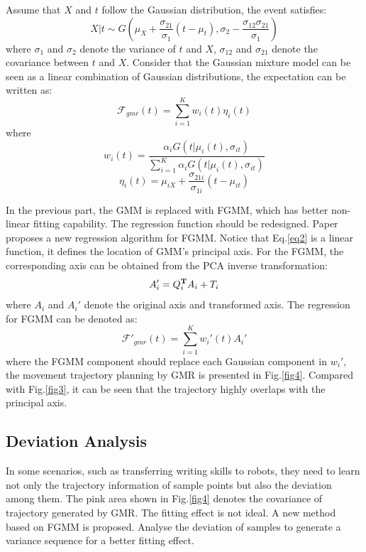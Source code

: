 \documentclass[journal]{IEEEtran}
\begin{document}
Assume that $X$ and $t$ follow the Gaussian distribution, the event satisfies:
\begin{equation}
    X|t \sim G(\mu_X+\frac{\sigma_{21}}{\sigma_{1}}(t-\mu_t),\sigma_{2}-\frac{\sigma_{12}\sigma_{21}}{\sigma_{1}})
\end{equation}
where $\sigma_{1}$ and $\sigma_{2}$ denote the variance of $t$ and $X$, $\sigma_{12}$ and $\sigma_{21}$ denote the covariance between $t$ and $X$. Consider that the Gaussian mixture model can be seen as a linear combination of Gaussian distributions, the expectation can be written as:
\begin{equation}
    \mathcal{F} _{gmr}(t)=\sum\limits_{i=1}^{K}w_i(t)\eta_i(t)
\end{equation}
where
\begin{equation}
    w_i(t)=\frac{\alpha_{i}G(t|\mu_{i}(t),\sigma_{it})}{\sum_{i=1}^{K}\alpha_{i}G(t|\mu_{i}(t),\sigma_{it})}
\end{equation}
\begin{equation}
    \eta_i(t)=\mu_{iX}+\frac{\sigma_{21i}}{\sigma_{1i}}(t-\mu_{it})
    \label{eq2}
\end{equation}

In the previous part, the GMM is replaced with FGMM, which has better non-linear fitting capability. The regression function should be redesigned. Paper\cite{Yang2019c} proposes a new regression algorithm for FGMM. Notice that Eq.\ref{eq2} is a linear function, it defines the location of GMM's principal axis. For the FGMM, the corresponding axis can be obtained from the PCA inverse transformation:
\begin{equation}
    A_i'=Q_i^{\bf{T}}A_i+T_i
\end{equation}
where $A_i$ and $A_i'$ denote the original axis and transformed axis. The regression for FGMM can be denoted as:
\begin{equation}
    \mathcal{F}' _{gmr}(t)=\sum\limits_{i=1}^{K}w_i'(t)A_i'
\end{equation}
where the FGMM component should replace each Gaussian component in $w_i'$, the movement trajectory planning by GMR is presented in Fig.\ref{fig4}. Compared with Fig.\ref{fig3}, it can be seen that the trajectory highly overlaps with the principal axis.

\subsection{Deviation Analysis}
In some scenarios, such as transferring writing skills to robots, they need to learn not only the trajectory information of sample points but also the deviation among them. The pink area shown in Fig.\ref{fig4} denotes the covariance of trajectory generated by GMR. The fitting effect is not ideal. A new method based on FGMM is proposed. Analyse the deviation of samples to generate a variance sequence for a better fitting effect.
\end{document}
